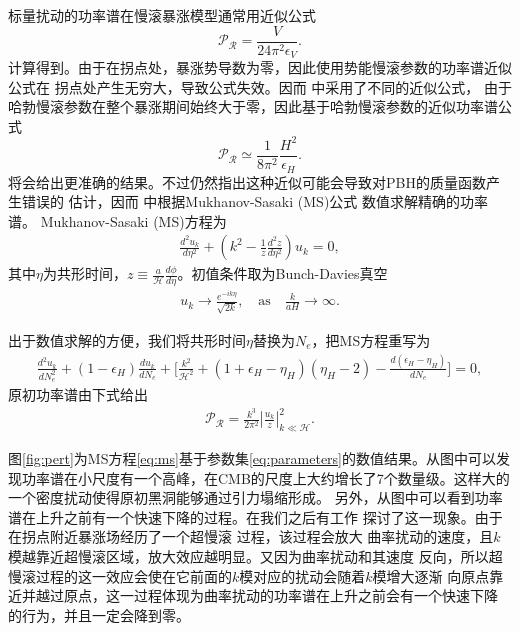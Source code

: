 标量扰动的功率谱在慢滚暴涨模型通常用近似公式
\begin{equation}
  \label{eq:scalar-perturbation-power-spectrum}
  \mathcal{P}_{\mathcal{R}} = \frac{V}{24\pi^2 \epsilon_V}.
\end{equation}
计算得到。由于在拐点处，暴涨势导数为零，因此使用势能慢滚参数的功率谱近似公式在
拐点处产生无穷大，导致公式失效。因而
\citep{germani2017primordial,motohashi2017primordial}中采用了不同的近似公式，
由于哈勃慢滚参数在整个暴涨期间始终大于零，因此基于哈勃慢滚参数的近似功率谱公式
\begin{equation}
  \label{eq:scalar-perturbation-power-spectrum-hubble}
  \mathcal{P}_{\mathcal{R}} \simeq
  \frac{1}{8\pi^2}\frac{H^2}{\epsilon_H}.
\end{equation}
将会给出更准确的结果。不过仍然指出这种近似可能会导致对PBH的质量函数产生错误的
估计，因而 \citep{ballesteros2018primordial}中根据Mukhanov-Sasaki (MS)公式
\citep{sasaki1986large,mukhanov1988quantum}数值求解精确的功率谱。 
Mukhanov-Sasaki (MS)方程为
\begin{align}\label{eq:ms}
    \frac{d^2u_k}{d\eta^2}+\left(k^2-\frac{1}{z}\frac{d^2z}{d\eta^2}\right)u_k=0,
\end{align}
其中$\eta$为共形时间，$z\equiv\frac{a}{\mathcal{H}}\frac{d\phi}{d\eta}$。初值条件取为Bunch-Davies真空\citep{bunch1978quantum}
\begin{align}
    u_k\rightarrow\frac{e^{-ik\eta}}{\sqrt{2k}},\quad\text{as}\quad
    \frac{k}{aH}\rightarrow\infty.
\end{align}

出于数值求解的方便，我们将共形时间$\eta$替换为$N_e$，把MS方程重写为\citep{ballesteros2018primordial}
\begin{align}
    \frac{d^2u_k}{dN^2_e}+\left(1-\epsilon_H\right)\frac{du_k}{dN_e}+
    \lbrack\frac{k^2}{\mathcal{H}^2}+\left(1+\epsilon_H-\eta_H\right)\left(\eta_H-2\right)-\frac{d\left(\epsilon_H-\eta_H\right)}{dN_e}\rbrack=0,
\end{align}
原初功率谱由下式给出
\begin{align}
    \mathcal{P_R}=\frac{k^3}{2\pi^2}\left\lvert\frac{u_k}{z}\right\rvert^2_{k\ll
    \mathcal{H}}.
\end{align}

图\ref{fig:pert}为MS方程\ref{eq:ms}基于参数集\ref{eq:parameters}的数值结果。从图中可以发现功率谱在小尺度有一个高峰，在CMB的尺度上大约增长了7个数量级。这样大的一个密度扰动使得原初黑洞能够通过引力塌缩形成。
另外，从图中可以看到功率谱在上升之前有一个快速下降的过程。在我们之后有工作
\citep{liu2020analytical}探讨了这一现象。由于在拐点附近暴涨场经历了一个超慢滚
过程，该过程会放大
曲率扰动的速度，且$k$模越靠近超慢滚区域，放大效应越明显。又因为曲率扰动和其速度
反向，所以超慢滚过程的这一效应会使在它前面的$k$模对应的扰动会随着$k$模增大逐渐
向原点靠近并越过原点，这一过程体现为曲率扰动的功率谱在上升之前会有一个快速下降
的行为，并且一定会降到零。

